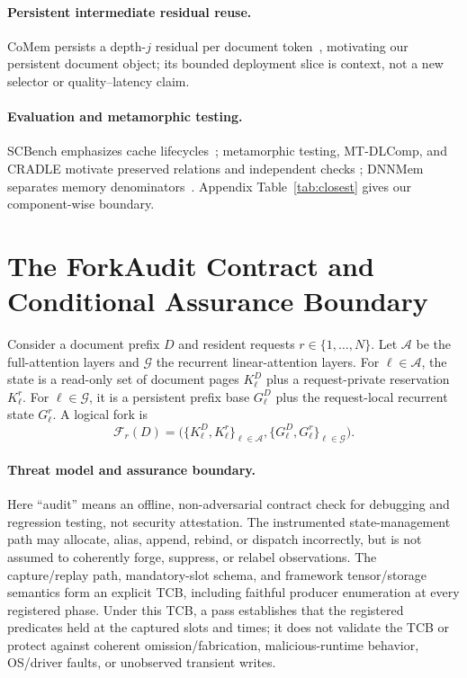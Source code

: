 \documentclass{article}
\begin{document}
\paragraph{Persistent intermediate residual reuse.}
CoMem persists a depth-$j$ residual per document token~\citep{liu2026comem,
liu2026understanding}, motivating our persistent document object; its bounded
deployment slice is context, not a new selector or quality--latency claim.

\paragraph{Evaluation and metamorphic testing.}
SCBench emphasizes cache lifecycles~\citep{li2025scbench}; metamorphic testing,
MT-DLComp, and CRADLE motivate preserved relations and independent checks
\citep{chen2018metamorphic,xiao2022metamorphic,pham2019cradle}; DNNMem separates
memory denominators~\citep{gao2020dnnmem}.  Appendix Table~\ref{tab:closest}
gives our component-wise boundary.

\section{The ForkAudit Contract and Conditional Assurance Boundary}
\label{sec:contract}

Consider a document prefix $D$ and resident requests
$r\in\{1,\ldots,N\}$.  Let $\mathcal{A}$ be the full-attention layers and
$\mathcal{G}$ the recurrent linear-attention layers.  For
$\ell\in\mathcal{A}$, the state is a read-only set of document pages
$K^D_\ell$ plus a request-private reservation $K^r_\ell$.  For
$\ell\in\mathcal{G}$, it is a persistent prefix base $G^D_\ell$ plus the
request-local recurrent state $G^r_\ell$.  A logical fork is
\begin{equation}
  \mathcal{F}_r(D) =
  \bigl(\{K^D_\ell,K^r_\ell\}_{\ell\in\mathcal{A}},
        \{G^D_\ell,G^r_\ell\}_{\ell\in\mathcal{G}}\bigr).
\end{equation}

\paragraph{Threat model and assurance boundary.}
Here ``audit'' means an offline, non-adversarial contract check for debugging
and regression testing, not security attestation.  The instrumented
state-management path may allocate, alias, append, rebind, or dispatch
incorrectly, but is not assumed to coherently forge, suppress, or relabel
observations.  The capture/replay path, mandatory-slot schema, and framework
tensor/storage semantics form an explicit TCB, including faithful producer
enumeration at every registered phase.  Under this TCB, a pass establishes
that the registered predicates held at the captured slots and times; it does
not validate the TCB or protect against coherent omission/fabrication,
malicious-runtime behavior, OS/driver faults, or unobserved transient writes.
\end{document}
